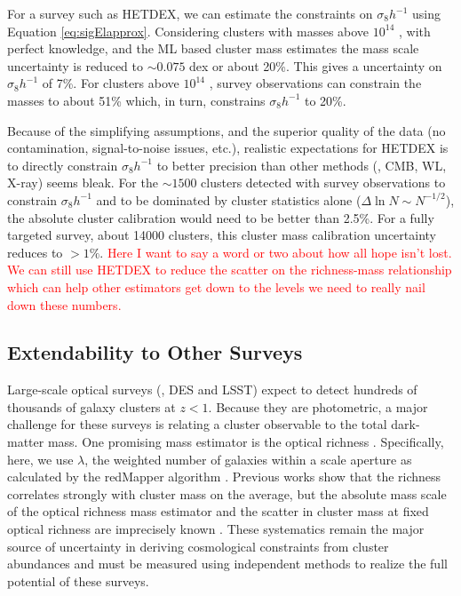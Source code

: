\documentclass[fleqn,usenatbib]{mnras}
\newcommand{\editorial}[1]{\textcolor{red}{#1}}
\begin{document}
For a survey such as HETDEX, we can estimate the constraints on $\sigma_8h^{-1}$ using Equation \ref{eq:sigElapprox}. Considering clusters with masses above $10^{14}$ \Msol, with perfect knowledge, and the ML based cluster mass estimates the mass scale uncertainty is reduced to $\sim 0.075$ dex or about 20\%. This gives a uncertainty on $\sigma_8h^{-1}$ of 7\%. For clusters above $10^{14}$ \Msol, survey observations can constrain the masses to about 51\% which, in turn, constrains $\sigma_8h^{-1}$ to 20\%.

Because of the simplifying assumptions, and the superior quality of the data (no contamination, signal-to-noise issues, etc.), realistic expectations for HETDEX is to directly constrain $\sigma_8h^{-1}$ to better precision than other methods (\eg, CMB, WL, X-ray) seems bleak. For the $\sim1500$ clusters detected with survey observations to constrain $\sigma_8h^{-1}$ and to be dominated by cluster statistics alone ($\Delta \ln N \sim N^{-1/2}$), the absolute cluster calibration would need to be better than 2.5\%. For a fully targeted survey, about 14000 clusters, this cluster mass calibration uncertainty reduces to $>1\%$.    
\editorial{Here I want to say a word or two about how all hope isn't lost. We can still use HETDEX to reduce the scatter on the richness-mass relationship which can help other estimators get down to the levels we need to really nail down these numbers.}

\subsection{Extendability to Other Surveys}
Large-scale optical surveys (\eg, DES and LSST) expect to detect hundreds of thousands of galaxy clusters at $z < 1$. Because they are photometric, a major challenge for these surveys is relating a cluster observable to the total dark-matter mass. One promising mass estimator is the optical richness . Specifically, here, we use $\lambda$, the weighted number of galaxies within a scale aperture  as calculated by the redMapper algorithm \citep{Rykoff2012}. Previous works  show that the richness correlates strongly with cluster mass on the average, but the absolute mass scale of the optical richness mass estimator and the scatter in cluster mass at fixed optical richness are imprecisely known \citep{Rykoff2012}. These systematics remain the major source of uncertainty in deriving cosmological constraints from cluster abundances and must be measured using independent methods to realize the full potential of these surveys.
\end{document}
